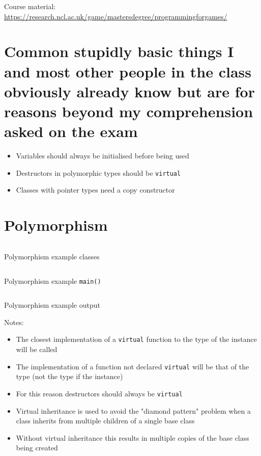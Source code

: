 \documentclass[a4paper]{article}
\begin{document}
\tableofcontents

\vfill
Course material:
\url{https://research.ncl.ac.uk/game/mastersdegree/programmingforgames/}

\section{Common stupidly basic things I and most other people in the class
         obviously already know but are for reasons beyond my comprehension
         asked on the exam}

\begin{itemize}
  \item
    Variables should always be initialised before being used

  \item
    Destructors in polymorphic types should be \texttt{virtual}

  \item
    Classes with pointer types need a copy constructor

\end{itemize}

\section{Polymorphism}

\begin{listing}[h!]
  \inputminted[linenos,frame=lines,firstline=5,lastline=43]{cpp}{listings/polymorphism_1.cpp}
  \caption{Polymorphism example classes}
  \label{listing:polymorphism_1}
\end{listing}
\FloatBarrier

\begin{listing}[h!]
  \inputminted[linenos,frame=lines,firstline=45]{cpp}{listings/polymorphism_1.cpp}
  \caption{Polymorphism example \texttt{main()}}
  \label{listing:polymorphism_1_main}
\end{listing}
\FloatBarrier

\begin{listing}[h!]
  \inputminted[linenos,frame=lines]{text}{out/polymorphism_1.txt}
  \caption{Polymorphism example output}
  \label{listing:polymorphism_1_out}
\end{listing}
\FloatBarrier

Notes:

\begin{itemize}
  \item The closest implementation of a \texttt{virtual} function to the type of
        the instance will be called
  \item The implementation of a function not declared \texttt{virtual} will be
        that of the type (not the type if the instance)
  \item For this reason destructors should always be \texttt{virtual}
  \item Virtual inheritance is used to avoid the "diamond pattern" problem when
        a class inherits from multiple children of a single base class
  \item Without virtual inheritance this results in multiple copies of the base
        class being created
\end{itemize}
\end{document}
